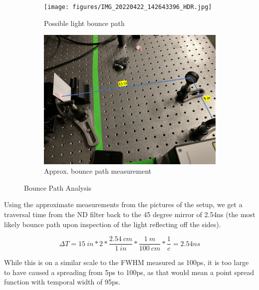 \documentclass[a4paper]{article}
\begin{document}
%
%

\begin{figure}
     \centering
     \begin{subfigure}[b]{0.49\textwidth}
         \centering
         \texttt{[image: figures/IMG\_20220422\_142643396\_HDR.jpg]}
         \caption{Possible light bounce path}
         \label{fig:light_path}
     \end{subfigure}
     \hfill
     \begin{subfigure}[b]{0.49\textwidth}
         \centering
         \includegraphics[width=\textwidth]{figures/distance_drawing.png}
         \caption{Approx. bounce path measurement}
         \label{fig:light_path_measured}
     \end{subfigure}
        \caption{Bounce Path Analysis}
        \label{fig:light_path_all}
\end{figure}

Using the approximate measurements from the pictures of the setup, we get a traversal time from the ND filter back to the 45 degree mirror of 2.54ns (the most likely bounce path upon inspection of the light reflecting off the sides).

\[
\Delta T=15\ in * 2 * \frac{2.54\ cm}{1\ in} * \frac{1\ m}{100\ cm} * \frac{1}{c} = 2.54 ns
\]

While this is on a similar scale to the FWHM measured as 100ps, it is too large to have caused a spreading from 5ps to 100ps, as that would mean a point spread function with temporal width of 95ps. 
\end{document}

